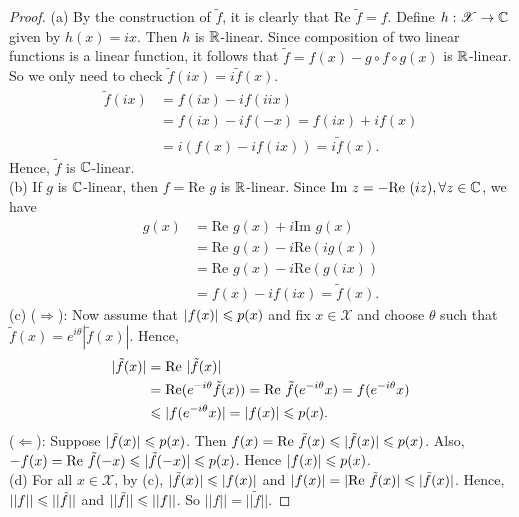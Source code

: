 \begin{proof}
    (a) By the construction of $\tilde{f}$, it is clearly that $\text{Re }\tilde{f}=f$.
    Define $h:\mathscr{X}\rightarrow \mathbb{C}$ given by $h(x)=ix$. Then $h$ is $\mathbb{R}$-linear.
    Since composition of two linear functions is a linear function,
    it follows that $\tilde{f}=f(x)-g\circ f \circ g(x)$ is $\mathbb{R}$-linear.
    So we only need to check $\tilde{f}(ix)=i\tilde{f}(x)$.
    \begin{align*}
        \tilde{f}(ix)&= f(ix)-if(iix)\\
                    &= f(ix)-if(-x)=f(ix)+if(x)\\
                    &=i(f(x)-if(ix))=i\tilde{f}(x).
    \end{align*}
    Hence, $\tilde{f}$ is $\mathbb{C}$-linear.\\
    (b) If $g$ is $\mathbb{C}$-linear, then $f=\text{Re }g$ is $\mathbb{R}$-linear.
    Since $\text{Im }z=-\text{Re }(iz), \forall z\in\mathbb{C}$, we have
    \begin{align*}
        g(x)&=\text{Re }g(x) + i\text{Im }g(x)\\
            &= \text{Re }g(x)-i\text{Re}(ig(x))\\
            &= \text{Re }g(x)-i\text{Re}(g(ix))\\
            &= f(x)-if(ix)=\tilde{f}(x).
    \end{align*}
    (c) ($\Rightarrow$):
    Now assume that $|f(x)|\leqslant p(x)$ and
    fix $x\in\mathscr{X}$ and choose $\theta$ such that 
    $\tilde{f}(x)=e^{i\theta}|\tilde{f}(x)|$.
    Hence,
    \begin{align*}
        |\tilde{f}(x)|&= \text{Re }|\tilde{f}(x)|\\
                      &= \text{Re}(e^{-i\theta}\tilde{f}(x)) =\text{Re }\tilde{f}(e^{-i\theta}x)= f(e^{-i\theta}x) \\
                      &\leqslant |f(e^{-i\theta}x)|=|f(x)|\leqslant p(x).
    \end{align*} 
    ($\Leftarrow$):
    Suppose $|\tilde{f}(x)|\leqslant p(x)$. 
    Then $f(x)=\text{Re }\tilde{f}(x)\leqslant |\tilde{f}(x)|\leqslant p(x)$.
    Also, $-f(x)=\text{Re }\tilde{f}(-x)\leqslant |\tilde{f}(-x)|\leqslant p(x)$.
    Hence $|f(x)|\leqslant p(x)$.\\
    (d) For all $x\in\mathscr{X}$, by (c), $|\tilde{f}(x)|\leqslant |f(x)|$ 
    and $|f(x)|=|\text{Re }\tilde{f}(x)|\leqslant |\tilde{f}(x)|$. 
    Hence, $||f||\leqslant ||\tilde{f}||$ and $||\tilde{f}||\leqslant ||f||$. So $||f||=||\tilde{f}||$.
\end{proof}


